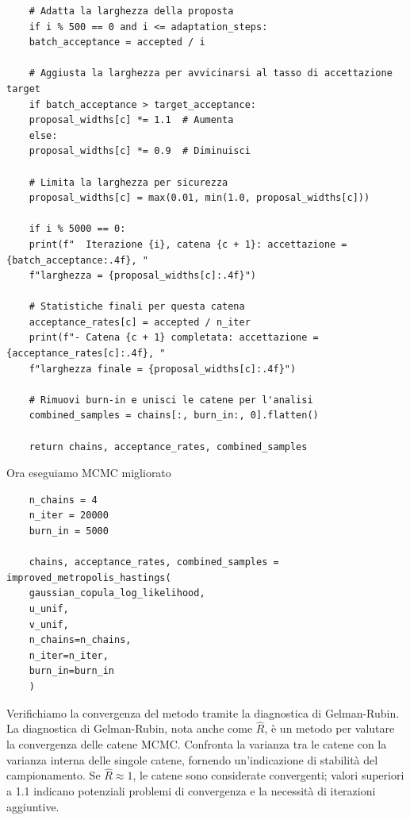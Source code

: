 \documentclass[%
	corpo=11pt,
    twoside,
    stile=classica,
    oldstyle,
    tipotesi=custom,
    greek,
    evenboxes,
]{toptesi}
\begin{document}
\begin{verbatim}
	# Adatta la larghezza della proposta
	if i % 500 == 0 and i <= adaptation_steps:
	batch_acceptance = accepted / i
	
	# Aggiusta la larghezza per avvicinarsi al tasso di accettazione target
	if batch_acceptance > target_acceptance:
	proposal_widths[c] *= 1.1  # Aumenta
	else:
	proposal_widths[c] *= 0.9  # Diminuisci
	
	# Limita la larghezza per sicurezza
	proposal_widths[c] = max(0.01, min(1.0, proposal_widths[c]))
	
	if i % 5000 == 0:
	print(f"  Iterazione {i}, catena {c + 1}: accettazione = {batch_acceptance:.4f}, "
	f"larghezza = {proposal_widths[c]:.4f}")
	
	# Statistiche finali per questa catena
	acceptance_rates[c] = accepted / n_iter
	print(f"- Catena {c + 1} completata: accettazione = {acceptance_rates[c]:.4f}, "
	f"larghezza finale = {proposal_widths[c]:.4f}")
	
	# Rimuovi burn-in e unisci le catene per l'analisi
	combined_samples = chains[:, burn_in:, 0].flatten()
	
	return chains, acceptance_rates, combined_samples
\end{verbatim}
Ora eseguiamo MCMC migliorato
\begin{verbatim}
	n_chains = 4
	n_iter = 20000
	burn_in = 5000
	
	chains, acceptance_rates, combined_samples = improved_metropolis_hastings(
	gaussian_copula_log_likelihood,
	u_unif,
	v_unif,
	n_chains=n_chains,
	n_iter=n_iter,
	burn_in=burn_in
	)
\end{verbatim}
Verifichiamo la convergenza del metodo tramite la diagnostica di Gelman-Rubin.\\

La diagnostica di Gelman-Rubin, nota anche come \(\hat{R}\), è un metodo per valutare la convergenza delle catene MCMC. Confronta la varianza tra le catene con la varianza interna delle singole catene, fornendo un'indicazione di stabilità del campionamento. Se \(\hat{R} \approx 1\), le catene sono considerate convergenti; valori superiori a 1.1 indicano potenziali problemi di convergenza e la necessità di iterazioni aggiuntive.
\end{document}
